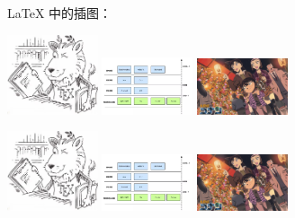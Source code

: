\documentclass{ctexart}
\begin{document}
    \LaTeX{} 中的插图：

    \includegraphics[angle=-45, width=0.2\textwidth]{lion.jpg}
    \includegraphics[width=0.2\textwidth]{cs.jpg}
    \includegraphics[angle=45, width=0.2\textwidth]{conan.jpg}

    \includegraphics[width=0.2\textwidth]{lion.jpg}
    \includegraphics[width=0.2\textwidth]{cs.jpg}
    \includegraphics[width=0.2\textwidth]{conan.jpg}
\end{document}

